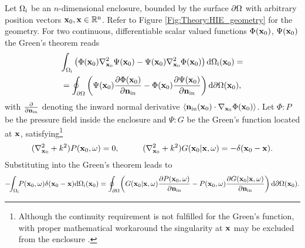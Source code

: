 Let $\Omega_{\mathrm{i}}$ be an $n$-dimensional enclosure, bounded by the surface $\partial \Omega$ with arbitrary position vectors $\mathbf{x}_0, \mathbf{x} \in \mathbb{R}^{\mathrm{n}}$. 
Refer to Figure \ref{Fig:Theory:HIE_geometry} for the geometry. 
For two continuous, differentiable scalar valued functions $\Phi(\mathbf{x}_0)$, $\Psi(\mathbf{x}_0)$ the Green's theorem reads
\begin{multline}
\int_{\Omega_{\mathrm{i}}}
\left(  \Phi(\mathbf{x}_0) \nabla^2_{\mathbf{x}_0} \Psi(\mathbf{x}_0) - \Psi(\mathbf{x}_0) \nabla^2_{\mathbf{x}_0} \Phi(\mathbf{x}_0)   \right)   \mathrm{d} \Omega_{\mathrm{i}}(\mathbf{x}_0)=  \\  =
\oint_{\partial \Omega}  \left(  \Psi(\mathbf{x}_0) \frac{\partial \Phi(\mathbf{x}_0)}{\partial \mathbf{n}_{\mathrm{in}}}  - \Phi(\mathbf{x}_0) \frac{\partial \Psi(\mathbf{x}_0)}{\partial \mathbf{n}_{\mathrm{in}}}  \right)   \mathrm{d} \partial \Omega(\mathbf{x}_0),
\label{Eq:Theory:Greens-theorem}
\end{multline}
with $\frac{\partial}{\partial \mathbf{n}_{\mathrm{in}}}$ denoting the inward normal derivative $\langle \mathbf{n}_{\mathrm{in}}(\mathbf{x}_0) \cdot \nabla_{\mathbf{x}_0} \Phi(\mathbf{x}_0) \rangle$.
Let $\Phi:P$ be the pressure field inside the enclosure and $\Psi:G$ be the Green's function located at $\mathbf{x}$, satisfying\footnote{Although the continuity requirement is not fulfilled for the Green's function, with proper mathematical workaround the singularity at $\mathbf{x}$ may be excluded from the enclosure \cite{Williams1999}.}
\begin{equation}
(\nabla_{\vxo}^2 + k^2)P(\vxo,\omega) = 0, \hspace{10mm}
(\nabla_{\vxo}^2 + k^2)G(\vxo|\vx,\omega) = -\delta(\vxo - \vx).
\end{equation}
Substituting into the Green's theorem leads to
\begin{equation}
\small
-\!\! \int_{\Omega_{\mathrm{i}}} \!\!P(\mathbf{x}_0,\omega) \delta(\mathbf{x}_0 - \mathbf{x})
  \mathrm{d} \Omega_{\mathrm{i}}(\mathbf{x}_0) = 
\oint_{\partial \Omega} \! \left( G(\mathbf{x}_0|\mathbf{x},\omega) \frac{\partial P(\mathbf{x}_0,\omega)}{\partial \mathbf{n}_{\mathrm{in}}}  - P(\mathbf{x}_0,\omega)  \frac{\partial G(\mathbf{x}_0|\mathbf{x},\omega)}{\partial \mathbf{n}_{\mathrm{in}}} \right) \mathrm{d} \partial \Omega(\mathbf{x}_0).
\end{equation}

